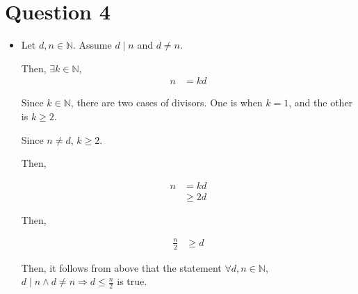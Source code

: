 \documentclass[12pt]{article}
\begin{document}
\section*{Question 4}
\begin{itemize}
    \item

    Let $d,n \in \mathbb{N}$. Assume $d \mid n$ and $d \neq n$.

    \bigskip

    Then, $\exists k \in \mathbb{N}$,
    \setcounter{equation}{0}
    \begin{align}
        n &= kd
    \end{align}

    \bigskip

    Since $k \in \mathbb{N}$, there are two cases of divisors. One is when $k = 1$,
    and the other is $k \geq 2$.

    \bigskip

    Since $n \neq d$, $k \geq 2$.

    \bigskip

    Then,

    \begin{align}
        n &= kd\\
        &\geq 2d
    \end{align}

    \bigskip

    Then,

    \begin{align}
        \frac{n}{2} &\geq d
    \end{align}

    Then, it follows from above that the statement $\forall d,n \in \mathbb{N}$,
    $d \mid n \land d \neq n \Rightarrow d \leq \frac{n}{2}$ is true.

\end{itemize}
\end{document}
